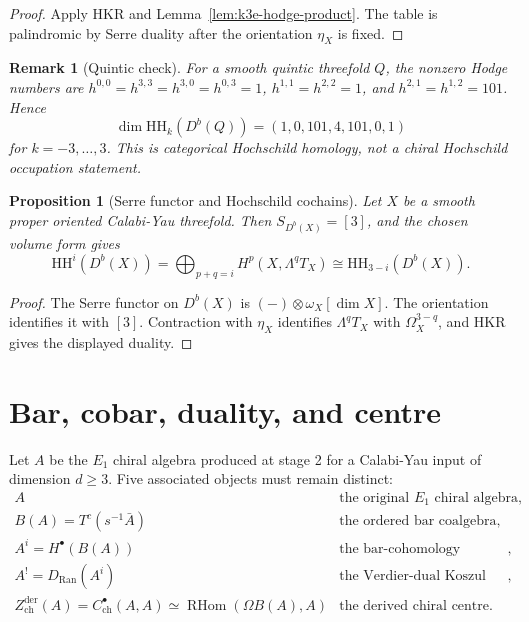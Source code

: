 \documentclass[11pt]{amsart}
\newtheorem{proposition}[theorem]{Proposition}
\newtheorem{remark}[theorem]{Remark}
\newcommand{\HH}{\mathrm{HH}}
\newcommand{\Db}{D^{b}}
\newcommand{\Ran}{\mathrm{Ran}}
\newcommand{\Zchder}{Z^{\mathrm{der}}_{\mathrm{ch}}}
\DeclareMathOperator{\RHom}{RHom}
\begin{document}
\begin{proof}
Apply HKR and Lemma~\ref{lem:k3e-hodge-product}.  The table is
palindromic by Serre duality after the orientation $\eta_X$ is fixed.
\end{proof}

\begin{remark}[Quintic check]
For a smooth quintic threefold $Q$, the nonzero Hodge numbers are
$h^{0,0}=h^{3,3}=h^{3,0}=h^{0,3}=1$,
$h^{1,1}=h^{2,2}=1$, and $h^{2,1}=h^{1,2}=101$.  Hence
\[
\dim\HH_k(\Db(Q))=(1,0,101,4,101,0,1)
\]
for $k=-3,\ldots,3$.  This is categorical Hochschild homology, not a
chiral Hochschild occupation statement.
\end{remark}

\begin{proposition}[Serre functor and Hochschild cochains]
\label{prop:serre-hh-cochains}
Let $X$ be a smooth proper oriented Calabi-Yau threefold.  Then
$S_{\Db(X)}=[3]$, and the chosen volume form gives
\[
 \HH^i(\Db(X))
 =
 \bigoplus_{p+q=i} H^p(X,\Lambda^q T_X)
 \cong
 \HH_{3-i}(\Db(X)).
\]
\end{proposition}

\begin{proof}
The Serre functor on $\Db(X)$ is
$(-)\otimes\omega_X[\dim X]$.  The orientation identifies it with
$[3]$.  Contraction with $\eta_X$ identifies
$\Lambda^qT_X$ with $\Omega_X^{3-q}$, and HKR gives the displayed
duality.
\end{proof}

\section{Bar, cobar, duality, and centre}

Let $A$ be the $E_1$ chiral algebra produced at stage 2 for a
Calabi-Yau input of dimension $d\geq3$.  Five associated objects must
remain distinct:
\[
\begin{array}{cl}
A & \text{the original }E_1\text{ chiral algebra},\\
B(A)=T^c(s^{-1}\bar A) & \text{the ordered bar coalgebra},\\
A^i=H^\bullet(B(A)) & \text{the bar-cohomology coalgebra},\\
A^!=D_{\Ran}(A^i) & \text{the Verdier-dual Koszul algebra},\\
\Zchder(A)=C^\bullet_{\mathrm{ch}}(A,A)
  \simeq \RHom(\Omega B(A),A) & \text{the derived chiral centre}.
\end{array}
\]
\end{document}
